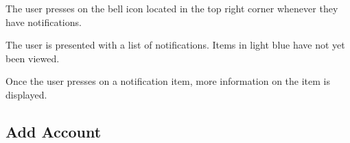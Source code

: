 \begin{figure}
\begin{minipage}{4.6cm}
    \caption{}
    \label{fig:ui_not_step3}
  \end{minipage}
\end{figure}

\begin{minipage}{\textwidth}
  \centering
  \begin{minipage}[t]{4.6cm}
    \vspace{0pt}
    \centering
    \begin{minipage}{4.4cm}
      The user presses on the bell icon located in the top right corner whenever they have notifications.
    \end{minipage}
  \end{minipage}
  \begin{minipage}[t]{4.6cm}
    \vspace{0pt}
    \centering
    \begin{minipage}{4.4cm}
      The user is presented with a list of notifications. Items in light blue have not yet been viewed.
    \end{minipage}
  \end{minipage}
  \begin{minipage}[t]{4.6cm}
    \vspace{0pt}
    \centering
    \begin{minipage}{4.4cm}
      Once the user presses on a notification item, more information on the item is displayed.
    \end{minipage}
  \end{minipage}
\end{minipage}

\clearpage

\subsection{Add Account}

